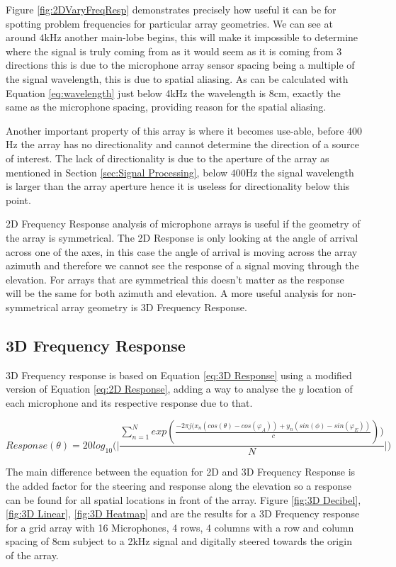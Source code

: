 \documentclass{UoNMCHA}
\numberwithin{equation}{section}
\begin{document}
    Figure \ref{fig:2DVaryFreqResp} demonstrates precisely how useful it can be for spotting problem frequencies for particular array geometries. We can see at around $4$kHz another main-lobe begins, this will make it impossible to determine where the signal is truly coming from as it would seem as it is coming from 3 directions this is due to the microphone array sensor spacing being a multiple of the signal wavelength, this is due to spatial aliasing. As can be calculated with Equation \ref{eq:wavelength} just below 4kHz the wavelength is 8cm, exactly the same as the microphone spacing, providing reason for the spatial aliasing.
    
    Another important property of this array is where it becomes use-able, before $400$Hz the array has no directionality and cannot determine the direction of a source of interest. The lack of directionality is due to the aperture of the array as mentioned in Section \ref{sec:Signal Processing}, below $400$Hz the signal wavelength is larger than the array aperture hence it is useless for directionality below this point.
    
    2D Frequency Response analysis of microphone arrays is useful if the geometry of the array is symmetrical. The 2D Response is only looking at the angle of arrival across one of the axes, in this case the angle of arrival is moving across the array azimuth and therefore we cannot see the response of a signal moving through the elevation. For arrays that are symmetrical this doesn't matter as the response will be the same for both azimuth and elevation. A more useful analysis for non-symmetrical array geometry is 3D Frequency Response.
\subsection{3D Frequency Response} \label{sec:3D Freq Response}
    3D Frequency response is based on Equation \ref{eq:3D Response} using a modified version of Equation \ref{eq:2D Response}, adding a way to analyse the $y$ location of each microphone and its respective response due to that.
    
    \begin{equation}
        Response(\theta) = 20log_{10} \Big( \Big|\frac{\sum_{n=1}^N exp(\frac{-2\pi j(x_n(cos(\theta)-cos(\varphi_A))+y_n(sin(\phi)-sin(\varphi_E))}{c}))}{N}\Big| \Big)
        \label{eq:3D Response}
    \end{equation}
    
    The main difference between the equation for 2D and 3D Frequency Response is the added factor for the steering and response along the elevation so a response can be found for all spatial locations in front of the array. Figure \ref{fig:3D Decibel}, \ref{fig:3D Linear}, \ref{fig:3D Heatmap} and are the results for a 3D Frequency response for a grid array with 16 Microphones, 4 rows, 4 columns with a row and column spacing of 8cm subject to a 2kHz signal and digitally steered towards the origin of the array.
    
\end{document}

